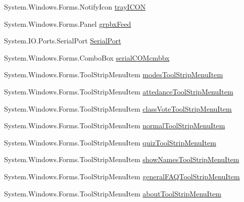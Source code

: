 \begin{DoxyCompactItemize}
\item 
\-System.\-Windows.\-Forms.\-Notify\-Icon \hyperlink{class_sr_p___classroom_inq_1_1frm_classrrom_inq_a8c062d5fe665631b364688c76e36e7f7}{tray\-I\-C\-O\-N}
\item 
\-System.\-Windows.\-Forms.\-Panel \hyperlink{class_sr_p___classroom_inq_1_1frm_classrrom_inq_aef19294d5a98aeb9030537fe32d25fde}{grpbx\-Feed}
\item 
\-System.\-I\-O.\-Ports.\-Serial\-Port \hyperlink{class_sr_p___classroom_inq_1_1frm_classrrom_inq_ae7bb088b1faefea06978daccf238ecd0}{\-Serial\-Port}
\item 
\-System.\-Windows.\-Forms.\-Combo\-Box \hyperlink{class_sr_p___classroom_inq_1_1frm_classrrom_inq_a78530d93c34ef9033ba7bd57c265782a}{serial\-C\-O\-Mcmbbx}
\item 
\-System.\-Windows.\-Forms.\-Tool\-Strip\-Menu\-Item \hyperlink{class_sr_p___classroom_inq_1_1frm_classrrom_inq_a8eef2c0ef527338feb8e51e6ddef9cc1}{modes\-Tool\-Strip\-Menu\-Item}
\item 
\-System.\-Windows.\-Forms.\-Tool\-Strip\-Menu\-Item \hyperlink{class_sr_p___classroom_inq_1_1frm_classrrom_inq_a2ccfb297c675044ba746ce9c6839c2bc}{attedance\-Tool\-Strip\-Menu\-Item}
\item 
\-System.\-Windows.\-Forms.\-Tool\-Strip\-Menu\-Item \hyperlink{class_sr_p___classroom_inq_1_1frm_classrrom_inq_add88d2c77e31773b18b9a6b571f3207f}{class\-Vote\-Tool\-Strip\-Menu\-Item}
\item 
\-System.\-Windows.\-Forms.\-Tool\-Strip\-Menu\-Item \hyperlink{class_sr_p___classroom_inq_1_1frm_classrrom_inq_a19933124599a8ff87bd0d7fd10808c4e}{normal\-Tool\-Strip\-Menu\-Item}
\item 
\-System.\-Windows.\-Forms.\-Tool\-Strip\-Menu\-Item \hyperlink{class_sr_p___classroom_inq_1_1frm_classrrom_inq_a01bd4f13b978688a925fcace4c5f92bc}{quiz\-Tool\-Strip\-Menu\-Item}
\item 
\-System.\-Windows.\-Forms.\-Tool\-Strip\-Menu\-Item \hyperlink{class_sr_p___classroom_inq_1_1frm_classrrom_inq_a128944d3506ac87f9278cc8917a9e6f0}{show\-Names\-Tool\-Strip\-Menu\-Item}
\item 
\-System.\-Windows.\-Forms.\-Tool\-Strip\-Menu\-Item \hyperlink{class_sr_p___classroom_inq_1_1frm_classrrom_inq_a457cf8afff4e2fd2d76ffa56065350ad}{general\-F\-A\-Q\-Tool\-Strip\-Menu\-Item}
\item 
\-System.\-Windows.\-Forms.\-Tool\-Strip\-Menu\-Item \hyperlink{class_sr_p___classroom_inq_1_1frm_classrrom_inq_a91d70ebcd0a0ce1237f845c90919cc8b}{about\-Tool\-Strip\-Menu\-Item}

\end{DoxyCompactItemize}
